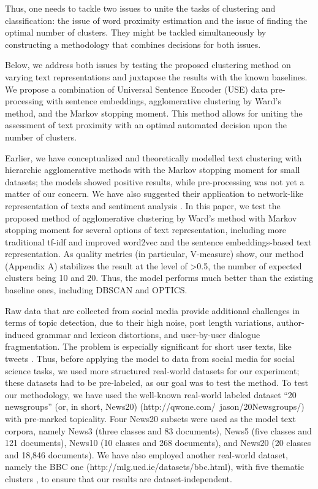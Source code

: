 Thus, one needs to tackle two issues to unite the tasks of clustering and classification: the issue of word proximity estimation and the issue of finding the optimal number of clusters. They might be tackled simultaneously by constructing a methodology that combines decisions for both issues.

Below, we address both issues by testing the proposed clustering method on varying text representations and juxtapose the results with the known baselines. We propose a combination of Universal Sentence Encoder (USE) data pre-processing with sentence embeddings, agglomerative clustering by Ward’s method, and the Markov stopping moment. This method allows for uniting the assessment of text proximity with an optimal automated decision upon the number of clusters.

Earlier, we have conceptualized and theoretically modelled text clustering with hierarchic agglomerative methods with the Markov stopping moment for small datasets; the models showed positive results, while pre-processing was not yet a matter of our concern. We have also suggested their application to network-like representation of texts and sentiment analysis \cite{OrekhovKharlamovBodrunova,KharlamovOrekhovBodrunova}. In this paper, we test the proposed method of agglomerative clustering by Ward’s method with Markov stopping moment for several options of text representation, including more traditional tf-idf and improved word2vec and the sentence embeddings-based text representation. As quality metrics (in particular, V-measure) show, our method (Appendix A) stabilizes the result at the level of >0.5, the number of expected clusters being 10 and 20. Thus, the model performs much better than the existing baseline ones, including DBSCAN and OPTICS.

Raw data that are collected from social media provide additional challenges in terms of topic detection, due to their high noise, post length variations, author-induced grammar and lexicon distortions, and user-by-user dialogue fragmentation. The problem is especially significant for short user texts, like tweets \cite{BodrunovaBlekanovKukarkin}. Thus, before applying the model to data from social media for social science tasks, we used more structured real-world datasets for our experiment; these datasets had to be pre-labeled, as our goal was to test the method. To test our methodology, we have used the well-known real-world labeled dataset “20 newsgroups” (or, in short, News20) (http://qwone.com/~jason/20Newsgroups/) with pre-marked topicality. Four News20 subsets were used as the model text corpora, namely News3 (three classes and 83 documents), News5 (five classes and 121 documents), News10 (10 classes and 268 documents), and News20 (20 classes and 18,846 documents). We have also employed another real-world dataset, namely the BBC one (http://mlg.ucd.ie/datasets/bbc.html), with five thematic clusters \cite{GreeneCunningham}, to ensure that our results are dataset-independent.

